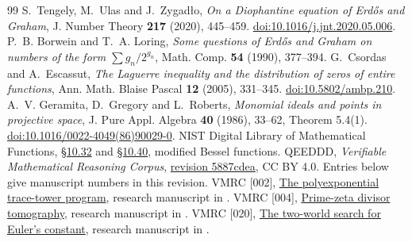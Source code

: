 \documentclass[11pt]{article}
\begin{document}
\begin{thebibliography}{99}\small
{} S.~Tengely, M.~Ulas and J.~Zygad\l o,
\emph{On a Diophantine equation of Erd\H{o}s and Graham},
J. Number Theory \textbf{217} (2020), 445--459.
\href{https://doi.org/10.1016/j.jnt.2020.05.006}{doi:10.1016/j.jnt.2020.05.006}.
 P.~B. Borwein and T.~A. Loring,
\emph{Some questions of Erd\H{o}s and Graham on numbers of the form
$\sum g_n/2^{g_n}$}, Math. Comp. \textbf{54} (1990), 377--394.
 G.~Csordas and A.~Escassut,
\emph{The Laguerre inequality and the distribution of zeros of entire functions},
Ann. Math. Blaise Pascal \textbf{12} (2005), 331--345.
\href{https://doi.org/10.5802/ambp.210}{doi:10.5802/ambp.210}.
 A.~V. Geramita, D.~Gregory and L.~Roberts,
\emph{Monomial ideals and points in projective space},
J. Pure Appl. Algebra \textbf{40} (1986), 33--62, Theorem 5.4(1).
\href{https://doi.org/10.1016/0022-4049(86)90029-0}{doi:10.1016/0022-4049(86)90029-0}.
 NIST Digital Library of Mathematical Functions,
\href{https://dlmf.nist.gov/10.32}{\S10.32}
and \href{https://dlmf.nist.gov/10.40}{\S10.40}, modified Bessel functions.
 QEEDDD, \emph{Verifiable Mathematical Reasoning Corpus},
\href{https://github.com/QEEDDD/Verifiable-Mathematical-Reasoning-Corpus/tree/5887cdea4898f0a3aa5bf7a8e0829697bd2b0f4b}{revision 5887cdea},
CC BY 4.0. Entries below give manuscript numbers in this revision.
 VMRC [002], \href{https://github.com/QEEDDD/Verifiable-Mathematical-Reasoning-Corpus/blob/5887cdea4898f0a3aa5bf7a8e0829697bd2b0f4b/\%5B002\%5D\%20The\%20Polyexponential\%20Trace-Tower\%20Program\%20\%28Moving\%20\%20Levels\%2C\%20Faber\%20and\%20Inverse\%20Monodromy\%2C\%20Positive\%20Spectra\%2C\%20and\%20Arithmetic\%20Barriers\%29.tex}{The polyexponential trace-tower program}, research manuscript in \cite{vmrepo}.
 VMRC [004], \href{https://github.com/QEEDDD/Verifiable-Mathematical-Reasoning-Corpus/blob/5887cdea4898f0a3aa5bf7a8e0829697bd2b0f4b/\%5B004\%5D\%20Prime-Zeta\%20Divisor\%20Tomography\%20Local\%20Zero\%20Processes\%2C\%20Frozen-Edge\%20Rigidity\%2C\%20and\%20Derivative\%20Caustics.tex}{Prime-zeta divisor tomography}, research manuscript in \cite{vmrepo}.
 VMRC [020], \href{https://github.com/QEEDDD/Verifiable-Mathematical-Reasoning-Corpus/blob/5887cdea4898f0a3aa5bf7a8e0829697bd2b0f4b/\%5B020\%5D\%20The\%20Two-World\%20Search\%20for\%20Euler\%E2\%80\%99s\%20Constant\%20\%28Shear\%20invariance\%2C\%20collision\%20worlds\%2C\%20forgeries\%2C\%20and\%20the\%20map\%20of\%20possible\%20worlds\%29.tex}{The two-world search for Euler's constant}, research manuscript in \cite{vmrepo}.

\end{thebibliography}
\end{document}
